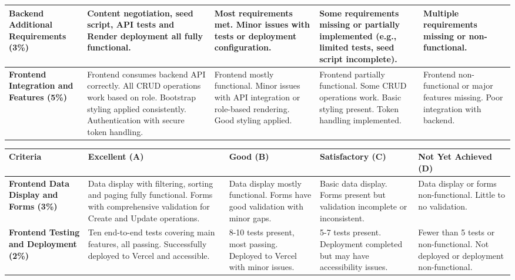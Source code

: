 \documentclass{article}
\begin{document}
\begin{landscape}
\begin{tabular}{|p{5cm}|p{4cm}|p{4cm}|p{4cm}|p{4cm}|}
\textbf{Backend Additional Requirements (3\%)} & 
Content negotiation, seed script, API tests and Render deployment all fully functional. & 
Most requirements met. Minor issues with tests or deployment configuration. & 
Some requirements missing or partially implemented (e.g., limited tests, seed script incomplete). & 
Multiple requirements missing or non-functional. \\ \hline

\textbf{Frontend Integration and Features (5\%)} & 
Frontend consumes backend API correctly. All CRUD operations work based on role. Bootstrap styling applied consistently. Authentication with secure token handling. & 
Frontend mostly functional. Minor issues with API integration or role-based rendering. Good styling applied. & 
Frontend partially functional. Some CRUD operations work. Basic styling present. Token handling implemented. & 
Frontend non-functional or major features missing. Poor integration with backend. \\ \hline

\end{tabular}


\begin{tabular}{|p{5cm}|p{4cm}|p{4cm}|p{4cm}|p{4cm}|}
\hline
\textbf{Criteria} & \textbf{Excellent (A)} & \textbf{Good (B)} & \textbf{Satisfactory (C)} & \textbf{Not Yet Achieved (D)} \\ \hline

\textbf{Frontend Data Display and Forms (3\%)} & 
Data display with filtering, sorting and paging fully functional. Forms with comprehensive validation for Create and Update operations. & 
Data display mostly functional. Forms have good validation with minor gaps. & 
Basic data display. Forms present but validation incomplete or inconsistent. & 
Data display or forms non-functional. Little to no validation. \\ \hline

\textbf{Frontend Testing and Deployment (2\%)} & 
Ten end-to-end tests covering main features, all passing. Successfully deployed to Vercel and accessible. & 
8-10 tests present, most passing. Deployed to Vercel with minor issues. & 
5-7 tests present. Deployment completed but may have accessibility issues. & 
Fewer than 5 tests or non-functional. Not deployed or deployment non-functional. \\ \hline

\end{tabular}


\end{landscape}
\end{document}
